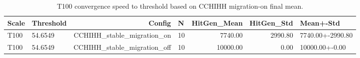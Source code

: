 \begin{table}[htbp]
\centering
\caption{T100 convergence speed to threshold based on CCHIHH migration-on final mean.}
\label{tab:t100_convergence_speed}
\begin{tabular}{llrlrrl}
\toprule
Scale & Threshold & Config & N & HitGen_Mean & HitGen_Std & Mean+-Std \\
\midrule
T100 & 54.6549 & CCHIHH_stable_migration_on & 10 & 7740.00 & 2990.80 & 7740.00+-2990.80 \\
T100 & 54.6549 & CCHIHH_stable_migration_off & 10 & 10000.00 & 0.00 & 10000.00+-0.00 \\
\bottomrule
\end{tabular}
\end{table}
